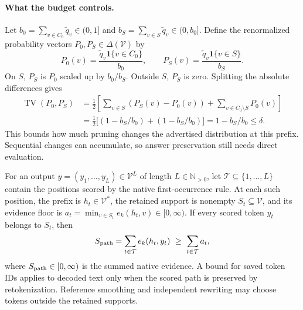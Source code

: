 \paragraph{What the budget controls.}
Let $b_0=\sum_{v\in C_0}\widetilde q_v\in(0,1]$ and $b_S=\sum_{v\in S}\widetilde q_v\in(0,b_0]$. Define the renormalized probability vectors $P_0,P_S\in\Delta(\mathcal V)$ by
\begin{equation}
\label{eq:pruning-laws}
 P_0(v)=\frac{\widetilde q_v\mathbf1\{v\in C_0\}}{b_0},\qquad
 P_S(v)=\frac{\widetilde q_v\mathbf1\{v\in S\}}{b_S}.
\end{equation}
On $S$, $P_S$ is $P_0$ scaled up by $b_0/b_S$. Outside $S$, $P_S$ is zero. Splitting the absolute differences gives
\begin{align}
 \operatorname{TV}(P_0,P_S)
 &=\frac12\left[\sum_{v\in S}(P_S(v)-P_0(v))
           +\sum_{v\in C_0\setminus S}P_0(v)\right]
     \label{eq:pruning-tv-split}\\
 &=\tfrac12\big[(1-b_S/b_0)+(1-b_S/b_0)\big]
   =1-b_S/b_0\leq\delta.
     \label{eq:pruning-tv-bound}
\end{align}
This bounds how much pruning changes the advertised distribution at this prefix. Sequential changes can accumulate, so answer preservation still needs direct evaluation.

For an output $y=(y_1,\ldots,y_L)\in\mathcal V^L$ of length $L\in\mathbb N_{>0}$, let $\mathcal T\subseteq\{1,\ldots,L\}$ contain the positions scored by the native first-occurrence rule. At each such position, the prefix is $h_t\in\mathcal V^*$, the retained support is nonempty $S_t\subseteq\mathcal V$, and its evidence floor is $a_t=\min_{v\in S_t}e_k(h_t,v)\in[0,\infty)$. If every scored token $y_t$ belongs to $S_t$, then
\begin{equation}
\label{eq:pruning-path-evidence}
 S_{\rm path}=\sum_{t\in\mathcal T}e_k(h_t,y_t)
 \ \geq\ \sum_{t\in\mathcal T}a_t,
\end{equation}
where $S_{\rm path}\in[0,\infty)$ is the summed native evidence. A bound for saved token IDs applies to decoded text only when the scored path is preserved by retokenization. Reference smoothing and independent rewriting may choose tokens outside the retained supports.
